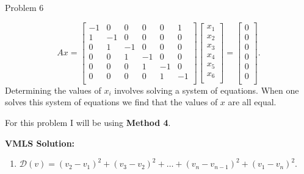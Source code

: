 \begin{problem}{Problem 6}
\begin{Highlight}
\begin{enumerate}[label = (\alph*), start = 2]
            \begin{equation}
                Ax = 
                \begin{bmatrix}
                    -1 & 0 & 0 & 0 & 0 & 1 \\
                    1 & -1 & 0 & 0 & 0 & 0 \\
                    0 & 1 & -1 & 0 & 0 & 0 \\
                    0 & 0 & 1 & -1 & 0 & 0 \\
                    0 & 0 & 0 & 1 & -1 & 0 \\
                    0 & 0 & 0 & 0 & 1 & -1 \\
                \end{bmatrix}
                \begin{bmatrix}
                    x_{1} \\
                    x_{2} \\
                    x_{3} \\
                    x_{4} \\
                    x_{5} \\
                    x_{6} \\
                \end{bmatrix}
                = 
                \begin{bmatrix}
                    0 \\
                    0 \\
                    0 \\
                    0 \\
                    0 \\
                    0 \\
                \end{bmatrix}.
            \end{equation}
            Determining the values of $x_{i}$ involves solving a system of equations. When one solves this system of equations we find that the values of $x$ are all equal.
        \end{enumerate}
    \end{Highlight}

    \begin{Highlight}
        For this problem I will be using \textbf{Method 4}. \vspace*{1em}

        \noindent \textbf{VMLS Solution:} 

        \begin{enumerate}[label = (\alph*), start = 3]
            \item $\mathcal{D}(v) = (v_{2} - v_{1})^{2} + (v_{3} - v_{2})^{2} + \dots + (v_{n} - v_{n - 1})^{2} + (v_{1} - v_{n})^{2}.$
        \end{enumerate}


\end{Highlight}
\end{problem}
